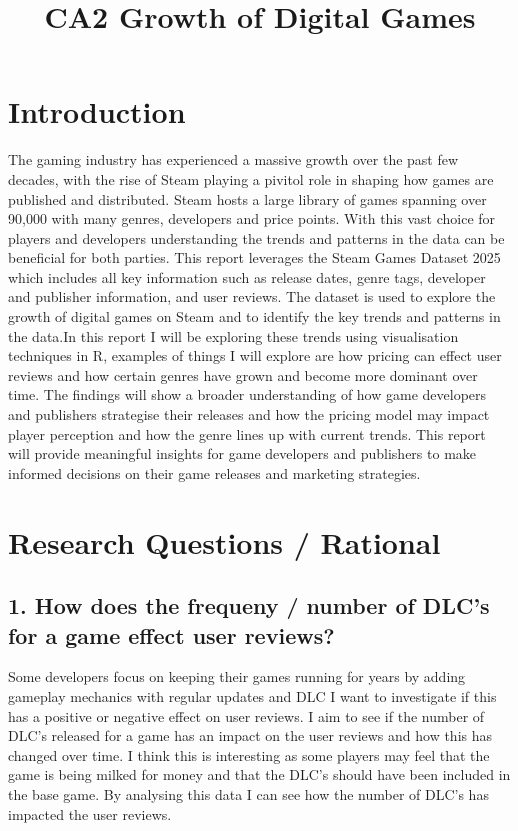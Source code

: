 \documentclass[
]{article}
\title{CA2 Growth of Digital Games}
\author{}
\date{\vspace{-2.5em}}
\begin{document}
\maketitle

\section{Introduction}\label{introduction}

The gaming industry has experienced a massive growth over the past few
decades, with the rise of Steam playing a pivitol role in shaping how
games are published and distributed. Steam hosts a large library of
games spanning over 90,000 with many genres, developers and price
points. With this vast choice for players and developers understanding
the trends and patterns in the data can be beneficial for both parties.
This report leverages the Steam Games Dataset 2025 which includes all
key information such as release dates, genre tags, developer and
publisher information, and user reviews. The dataset is used to explore
the growth of digital games on Steam and to identify the key trends and
patterns in the data.In this report I will be exploring these trends
using visualisation techniques in R, examples of things I will explore
are how pricing can effect user reviews and how certain genres have
grown and become more dominant over time. The findings will show a
broader understanding of how game developers and publishers strategise
their releases and how the pricing model may impact player perception
and how the genre lines up with current trends. This report will provide
meaningful insights for game developers and publishers to make informed
decisions on their game releases and marketing strategies.

\section{Research Questions /
Rational}\label{research-questions-rational}

\subsection{1. How does the frequeny / number of DLC's for a game effect
user
reviews?}\label{how-does-the-frequeny-number-of-dlcs-for-a-game-effect-user-reviews}

Some developers focus on keeping their games running for years by adding
gameplay mechanics with regular updates and DLC I want to investigate if
this has a positive or negative effect on user reviews. I aim to see if
the number of DLC's released for a game has an impact on the user
reviews and how this has changed over time. I think this is interesting
as some players may feel that the game is being milked for money and
that the DLC's should have been included in the base game. By analysing
this data I can see how the number of DLC's has impacted the user
reviews.
\end{document}
